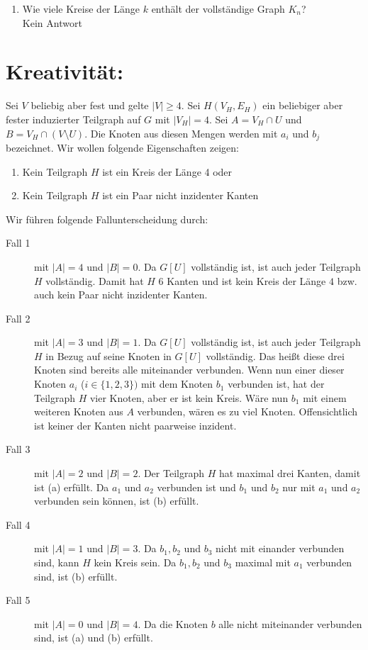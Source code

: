 \begin{enumerate}[label=(\alph*)]
        \item Wie viele Kreise der Länge $k$ enthält der vollständige Graph $K_n$? \\
        Kein Antwort
    \end{enumerate}

    \section*{Kreativität:}
Sei $V$ beliebig aber fest und gelte $|V| \ge 4$. Sei $H(V_H,E_H)$ ein beliebiger aber fester induzierter Teilgraph auf $G$ mit $|V_H|=4$. Sei $A=V_H \cap U$ und $B=V_H \cap (V\setminus U)$. Die Knoten aus diesen Mengen werden mit $a_i$ und $b_j$ bezeichnet. Wir wollen folgende Eigenschaften zeigen:
\begin{enumerate}[label=(\alph*)]
	\item Kein Teilgraph $H$ ist ein Kreis der Länge 4 oder 
	\item Kein Teilgraph $H$ ist ein Paar nicht inzidenter Kanten
\end{enumerate}

Wir führen folgende Fallunterscheidung durch:
\begin{description}
	\item[Fall 1] mit $|A|=4$ und $|B|=0$. Da $G[U]$ vollständig ist, ist auch jeder Teilgraph $H$ vollständig. Damit hat $H$ 6 Kanten und ist kein Kreis der Länge $4$ bzw. auch kein Paar nicht inzidenter Kanten.
	\item[Fall 2] mit $|A|=3$ und $|B|=1$. Da $G[U]$ vollständig ist, ist auch jeder Teilgraph $H$ in Bezug auf seine Knoten in $G[U]$ vollständig. Das heißt diese drei Knoten sind bereits alle miteinander verbunden. Wenn nun einer dieser Knoten $a_i$ ($i \in \{1,2,3\})$ mit dem Knoten $b_1$ verbunden ist, hat der Teilgraph $H$ vier Knoten, aber er ist kein Kreis. Wäre nun $b_1$ mit einem weiteren Knoten aus $A$ verbunden, wären es zu viel Knoten. Offensichtlich ist keiner der Kanten nicht paarweise inzident.
	\item[Fall 3] mit  $|A|=2$ und $|B|=2$. Der Teilgraph $H$ hat maximal drei Kanten, damit ist (a) erfüllt. Da $a_1$ und $a_2$ verbunden ist und $b_1$ und $b_2$ nur mit $a_1$ und $a_2$ verbunden sein können, ist (b) erfüllt.
	\item[Fall 4] mit  $|A|=1$ und $|B|=3$. Da $b_1, b_2$ und $b_3$ nicht mit einander verbunden sind, kann $H$ kein Kreis sein.  Da $b_1, b_2$ und $b_3$ maximal mit $a_1$ verbunden sind, ist (b) erfüllt.
	\item[Fall 5] mit  $|A|=0$ und $|B|=4$. Da die Knoten $b$ alle nicht miteinander verbunden sind, ist (a) und (b) erfüllt.
\end{description}

